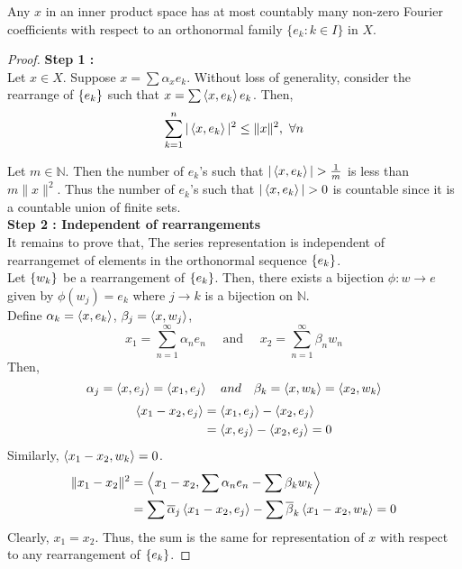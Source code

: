 \begin{lemma}
	Any $x$ in an inner product space has at most countably many non-zero Fourier coefficients with respect to an orthonormal family $\{ e_k : k \in I\}$ in $X$.
\end{lemma}
\begin{proof}
	\textbf{Step 1 : }\\
	Let $x \in X$.
	Suppose $x = \sum \alpha_x e_k$.
	Without loss of generality, consider the rearrange of $\left\{e_k\right\}$ such that $x = \sum \left\langle x,e_k \right\rangle e_k$.
	Then,
	\[ \sum_{k = 1}^n |\inner{x}{e_k}|^2 \le \|x\|^2,\ \forall n \]

	Let $m \in \mathbb{N}$.
	Then the number of $e_k$'s such that $|\left\langle x,e_k \right\rangle| > \frac{1}{m}$ is less than $m\|x\|^2$.
	Thus the number of $e_k$'s such that $|\left\langle x,e_k \right\rangle| > 0$ is countable since it is a countable union of finite sets.\\

	\textbf{Step 2 : Independent of rearrangements}\\
	It remains to prove that, The series representation is independent of rearrangemet of elements in the orthonormal sequence $\left\{e_k\right\}$.\\

	Let $\left\{w_k\right\}$ be a rearrangement of $\left\{e_k\right\}$.
	Then, there exists a bijection $\phi : w \to e$ given by $\phi(w_j) = e_k$ where $j \to k$ is a bijection on $\mathbb{N}$.\\
	
	Define $\alpha_k = \left\langle x,e_k \right\rangle$, $\beta_j = \left\langle x,w_j \right\rangle$,
	\[ x_1 = \sum_{n=1}^\infty \alpha_n e_n \quad \text{ and }\quad x_2 = \sum_{n=1}^\infty \beta_n w_n \]
	Then,
	\[ \alpha_j = \left\langle x,e_j \right\rangle = \left\langle x_1,e_j \right\rangle \quad and \quad \beta_k = \left\langle x,w_k \right\rangle = \left\langle x_2,w_k \right\rangle \]
	\begin{align*}
		\left\langle x_1-x_2,e_j \right\rangle 
		& = \left\langle x_1,e_j \right\rangle - \left\langle x_2,e_j \right\rangle \\
		& = \left\langle x,e_j \right\rangle - \left\langle x_2,e_j \right\rangle = 0
	\end{align*}
	Similarly, $\left\langle x_1-x_2,w_k \right\rangle = 0$.
	\begin{align*}
		\|x_1 - x_2 \|^2 
		& = \left\langle x_1-x_2,\sum \alpha_n e_n - \sum \beta_k w_k \right\rangle \\
		& = \sum \overline{\alpha}_j \left\langle x_1-x_2,e_j \right\rangle - \sum \overline{\beta}_k \left\langle x_1-x_2,w_k \right\rangle = 0
	\end{align*}
	Clearly, $x_1 = x_2$.
	Thus, the sum is the same for representation of $x$ with respect to any rearrangement of $\left\{e_k\right\}$.
\end{proof}

